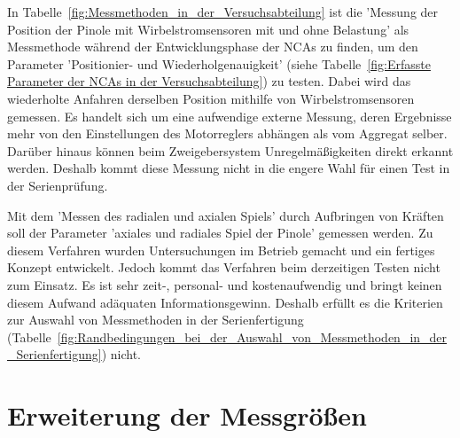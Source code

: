 





In Tabelle~\ref{fig:Messmethoden_in_der_Versuchsabteilung} ist die 'Messung der Position der Pinole mit Wirbelstromsensoren mit und ohne Belastung' als Messmethode während der Entwicklungsphase der NCAs zu finden, um den Parameter 'Positionier- und Wiederholgenauigkeit' (siehe Tabelle~\ref{fig:Erfasste Parameter der NCAs in der Versuchsabteilung}) zu testen. Dabei wird das wiederholte Anfahren derselben Position mithilfe von Wirbelstromsensoren gemessen. Es handelt sich um eine aufwendige externe Messung, deren Ergebnisse mehr von den Einstellungen des Motorreglers abhängen als vom Aggregat selber. Darüber hinaus können beim Zweigebersystem Unregelmäßigkeiten direkt erkannt werden. Deshalb kommt diese Messung nicht in die engere Wahl für einen Test in der Serienprüfung.










Mit dem 'Messen des radialen und axialen Spiels' durch Aufbringen von Kräften soll der Parameter 'axiales und radiales Spiel der Pinole' gemessen werden. Zu diesem Verfahren wurden Untersuchungen im Betrieb gemacht und ein fertiges Konzept entwickelt. Jedoch kommt das Verfahren beim derzeitigen Testen nicht zum Einsatz. Es ist sehr zeit-, personal- und kostenaufwendig und bringt keinen diesem Aufwand adäquaten Informationsgewinn. Deshalb erfüllt es die Kriterien zur Auswahl von Messmethoden in der Serienfertigung (Tabelle~\ref{fig:Randbedingungen_bei_der_Auswahl_von_Messmethoden_in_der_Serienfertigung}) nicht.




\section{Erweiterung der Messgrößen}\label{cha_Moegliche_Messgroeen}

